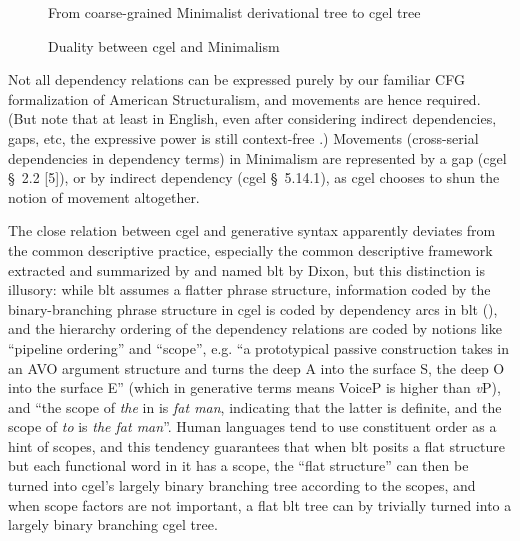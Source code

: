 \documentclass{article}
\newcommand*{\citesec}[1]{\S~{#1}}
\newcommand*{\corpus}[1]{\emph{#1}}
\newcommand*{\vP}{\textit{v}P}
\begin{document}
\begin{figure}
    \centering
    
    \caption{From coarse-grained Minimalist derivational tree to \ac{cgel} tree}
    \label{fig:coarse-grained}
\end{figure}

\begin{figure}
    \centering
    
    \caption{Duality between \ac{cgel} and Minimalism}
    \label{fig:cgel-minimalism}
\end{figure}

Not all dependency relations can be expressed purely 
by our familiar CFG formalization of American Structuralism,
and movements are hence required.
(But note that at least in English,  
even after considering indirect dependencies, gaps, etc,
the expressive power is still context-free \citep{pullum2008expressive}.)
Movements (cross-serial dependencies in dependency terms) in Minimalism 
are represented by a gap (\ac{cgel} \citesec{2.2} [5]),
or by indirect dependency (\ac{cgel} \citesec{5.14.1}),
as \ac{cgel} chooses to shun the notion of movement altogether.

The close relation between \ac{cgel} and generative syntax apparently deviates 
from the common descriptive practice, 
especially the common descriptive framework extracted and summarized 
by \citet{dixon2009basic1,dixon2010basic2,dixon2012basic3} and named \ac{blt} by Dixon,
but this distinction is illusory:
while \ac{blt} assumes a flatter phrase structure,
information coded by the binary-branching phrase structure in \ac{cgel}
is coded by dependency arcs in \ac{blt} (),
and the hierarchy ordering of the dependency relations 
are coded by notions like ``pipeline ordering'' and ``scope'',
e.g. ``a prototypical passive construction takes in an AVO argument structure 
and turns the deep A into the surface S, the deep O into the surface E''
(which in generative terms means VoiceP is higher than \vP),
and ``the scope of \corpus{the} in  is \corpus{fat man},
indicating that the latter is definite,
and the scope of \corpus{to} is \corpus{the fat man}''.
Human languages tend to use constituent order as a hint of scopes, 
and this tendency guarantees that
when \ac{blt} posits a flat structure but each functional word in it has a scope,
the ``flat structure'' can then be turned into \ac{cgel}'s largely binary branching tree
according to the scopes,
and when scope factors are not important,
a flat \ac{blt} tree can by trivially turned into a largely binary branching \ac{cgel} tree.
\end{document}
